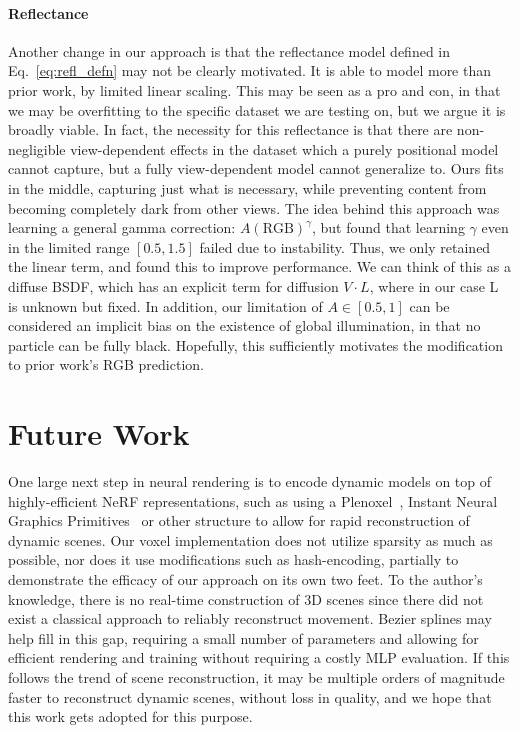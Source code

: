 \paragraph{Reflectance}\label{sec:refl_disc} Another change in our approach is that the reflectance model defined in Eq.~\ref{eq:refl_defn} may not be clearly motivated. It is able to model more than prior work, by limited linear scaling. This may be seen as a pro and con, in that we may be overfitting to the specific dataset we are testing on, but we argue it is broadly viable. In fact, the necessity for this reflectance is that there are non-negligible view-dependent effects in the dataset which a purely positional model cannot capture, but a fully view-dependent model cannot generalize to. Ours fits in the middle, capturing just what is necessary, while preventing content from becoming completely dark from other views. The idea behind this approach was learning a general gamma correction: $A (\text{RGB})^\gamma$, but found that learning $\gamma$ even in the limited range $[0.5,1.5]$ failed due to instability. Thus, we only retained the linear term, and found this to improve performance. We can think of this as a diffuse BSDF, which has an explicit term for diffusion $V\cdot L$, where in our case L is unknown but fixed. In addition, our limitation of $A\in[0.5,1]$ can be considered an implicit bias on the existence of global illumination, in that no particle can be fully black. Hopefully, this sufficiently motivates the modification to prior work's RGB prediction.

\section*{Future Work}

One large next step in neural rendering is to encode dynamic models on top of highly-efficient NeRF representations, such as using a Plenoxel~\cite{yu2021plenoxels}, Instant Neural Graphics Primitives~\cite{mueller2022instant} or other structure to allow for rapid reconstruction of dynamic scenes. Our voxel implementation does not utilize sparsity as much as possible, nor does it use modifications such as hash-encoding, partially to demonstrate the efficacy of our approach on its own two feet. To the author's knowledge, there is no real-time construction of 3D scenes since there did not exist a classical approach to reliably reconstruct movement. Bezier splines may help fill in this gap, requiring a small number of parameters and allowing for efficient rendering and training without requiring a costly MLP evaluation. If this follows the trend of scene reconstruction, it may be multiple orders of magnitude faster to reconstruct dynamic scenes, without loss in quality, and we hope that this work gets adopted for this purpose.

